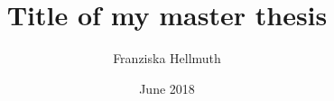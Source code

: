 \makeatletter
\title{Title of my master thesis}	\let\Title\@title
\author{Franziska Hellmuth}	\let\Author\@author
\date{June 2018}		\let\Date\@date
\makeatother